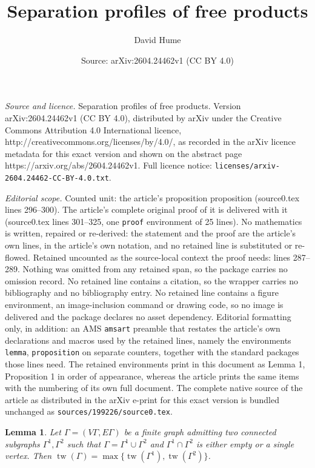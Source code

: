 \documentclass[10pt,a4paper]{amsart}
\title{Separation profiles of free products}
\author{David Hume}
\date{Source: arXiv:2604.24462v1 (CC BY 4.0)}
\newtheorem{lemma}{Lemma}
\DeclareMathOperator{\tw}{tw}
\begin{document}
\maketitle

\noindent\emph{Source and licence.} Separation profiles of free products. Version arXiv:2604.24462v1 (CC BY 4.0), distributed by arXiv under the Creative Commons Attribution 4.0 International licence, http://creativecommons.org/licenses/by/4.0/, as recorded in the arXiv licence metadata for this exact version and shown on the abstract page https://arxiv.org/abs/2604.24462v1. Full licence notice: \texttt{licenses/arxiv-2604.24462-CC-BY-4.0.txt}.\par\smallskip

\noindent\textit{Editorial scope.} Counted unit: the article's proposition proposition (source0.tex lines 296--300). The article's complete original proof of it is delivered with it (source0.tex lines 301--325, one \texttt{proof} environment of 25 lines). No mathematics is written, repaired or re-derived: the statement and the proof are the article's own lines, in the article's own notation, and no retained line is substituted or re-flowed.  Retained uncounted as the source-local context the proof needs: lines 287--289.  Nothing was omitted from any retained span, so the package carries no omission record.  No retained line contains a citation, so the wrapper carries no bibliography and no bibliography entry.  No retained line contains a figure environment, an image-inclusion command or drawing code, so no image is delivered and the package declares no asset dependency.  Editorial formatting only, in addition: an AMS \texttt{amsart} preamble that restates the article's own declarations and macros used by the retained lines, namely the environments \texttt{lemma}, \texttt{proposition} on separate counters, together with the standard packages those lines need.  The retained environments print in this document as Lemma 1, Proposition 1 in order of appearance, whereas the article prints the same items with the numbering of its own full document.  The complete native source of the article as distributed in the arXiv e-print for this exact version is bundled unchanged as \texttt{sources/199226/source0.tex}.
\begin{lemma}\label{lem:twjoin}
    Let $\Gamma=(V\Gamma,E\Gamma)$ be a finite graph admitting two connected subgraphs $\Gamma^1,\Gamma^2$ such that $\Gamma=\Gamma^1\cup\Gamma^2$ and $\Gamma^1\cap \Gamma^2$ is either empty or a single vertex. Then $\tw(\Gamma)=\max\{\tw(\Gamma^1),\tw(\Gamma^2)\}$.
\end{lemma}
\end{document}

